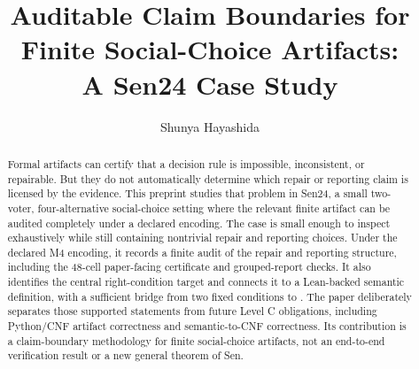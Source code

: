 \documentclass[11pt]{article}
\title{Auditable Claim Boundaries for Finite Social-Choice Artifacts:\\
A Sen24 Case Study}
\author{Shunya Hayashida}
\date{}
\DeclareRobustCommand{\code}[1]{\path{#1}}
\begin{document}
\maketitle

\begin{abstract}
Formal artifacts can certify that a decision rule is impossible, inconsistent,
or repairable. But they do not automatically determine which repair or
reporting claim is licensed by the evidence. This preprint studies that
problem in Sen24, a small two-voter, four-alternative social-choice setting
where the relevant finite artifact can be audited completely under a declared
encoding. The case is small enough to inspect exhaustively while still
containing nontrivial repair and reporting choices. Under the declared M4
encoding, it records a finite audit of the repair and reporting structure,
including the 48-cell
paper-facing certificate and grouped-report checks. It also identifies the
central right-condition target and connects it to a Lean-backed semantic
definition, with a sufficient bridge from two fixed conditions to
\code{MINLIB}. The paper deliberately separates those supported statements
from future Level C obligations, including Python/CNF artifact correctness and
semantic-to-CNF correctness. Its contribution is a claim-boundary methodology
for finite social-choice artifacts, not an
end-to-end verification result or a new general theorem of Sen.
\end{abstract}











\appendix




\end{document}
